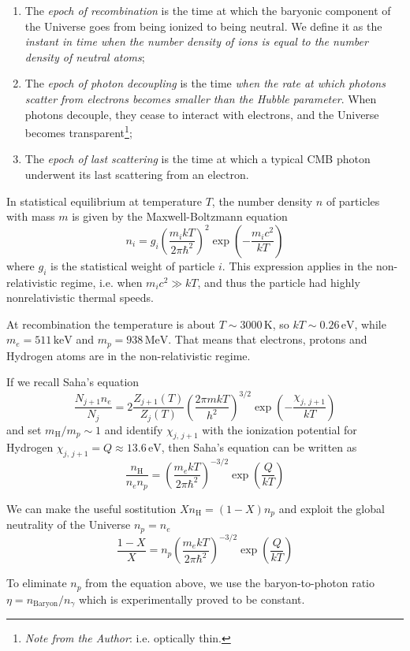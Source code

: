 \begin{enumerate}
    \item The \emph{epoch of recombination} is the time at which the baryonic component of the Universe goes from being ionized to being neutral. We define it as the \emph{instant in time when the number density of ions is equal to the number density of neutral atoms};
    \item The \emph{epoch of photon decoupling} is the time \emph{when the rate at which photons scatter from electrons becomes smaller than the Hubble parameter}. When photons decouple, they cease to interact with electrons, and the Universe becomes transparent\footnote{\emph{Note from the Author}: i.e. optically thin.};
    \item The \emph{epoch of last scattering} is the time at which a typical CMB photon underwent its last scattering from an electron.
\end{enumerate}
In statistical equilibrium at temperature $T$, the number density $n$ of particles with mass $m$ is given by the Maxwell-Boltzmann equation
\begin{equation}
	n_{i} = g_{i}\left(\frac{m_{i}kT}{2\pi\hbar^{2}}\right)^{2}\exp\left(-\frac{m_{i}c^{2}}{kT}\right)
	\label{eq:maxwelldistrib}
\end{equation}
where $g_{i}$ is the statistical weight of particle $i$. This expression applies in the non-relativistic regime, i.e. when $m_{i}c^{2} \gg kT$, and thus the particle had highly nonrelativistic thermal speeds.
\par At recombination the temperature is about $T \sim 3000\,\text{K}$, so $kT \sim 0.26\,\text{eV}$, while $m_{e} = 511\,\text{keV}$ and $m_{p} = 938\,\text{MeV}$. That means that electrons, protons and Hydrogen atoms are in the non-relativistic regime.
\par If we recall Saha's equation
\begin{equation}
	\frac{N_{j+1}n_{e}}{N_{j}} = 2\frac{Z_{j+1}(T)}{Z_{j}(T)}\left(\frac{2\pi m k T}{h^{2}}\right)^{3/2}\exp\left(-\frac{\chi_{j,\,j+1}}{kT}\right)
	\label{eq:saha}
\end{equation}
and set $m_{\text{H}}/m_{p} \sim 1$ and identify $\chi_{j,\,j+1}$ with the ionization potential for Hydrogen $\chi_{j,\,j+1} = Q \approx 13.6\,\text{eV}$, then Saha's equation can be written as
\begin{equation*}
    \frac{n_{\text{H}}}{n_{e}n_{p}} = \left(\frac{m_{e}kT}{2\pi\hbar^{2}}\right)^{-3/2}\exp\left(\frac{Q}{kT}\right)
\end{equation*}
\par We can make the useful sostitution $Xn_{\text{H}} = (1-X)n_{p}$ and exploit the global neutrality of the Universe $n_{p} = n_{e}$
\begin{equation*}
    \frac{1-X}{X} = n_{p}\left(\frac{m_{e}kT}{2\pi\hbar^{2}}\right)^{-3/2}\exp\left(\frac{Q}{kT}\right)
\end{equation*}
\par To eliminate $n_{p}$ from the equation above, we use the baryon-to-photon ratio $\eta = n_{\text{Baryon}}/n_{\gamma}$ which is experimentally proved to be constant.

